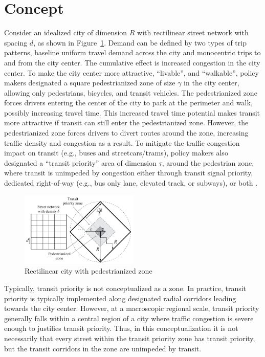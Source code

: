 \documentclass{elsarticle}\usepackage[]{graphicx}\usepackage[]{color}
\begin{document}
\section{Concept}
Consider an idealized city of dimension $R$ with rectilinear street network with spacing $d$, as shown in Figure~\ref{fig:gridcity}. Demand can be defined by two types of trip patterns, baseline uniform travel demand across the city and monocentric trips to and from the city center. The cumulative effect is increased congestion in the city center. To make the city center more attractive, ``livable'', and ``walkable'', policy makers designated a square pedestrianized zone of size $\gamma$ in the city center, allowing only pedestrians, bicycles, and transit vehicles. The pedestrianized zone forces drivers entering the center of the city to park at the perimeter and walk, possibly increasing travel time. This increased travel time potential makes transit more attractive if transit can still enter the pedestrianized zone. However, the pedestrianized zone forces drivers to divert routes around the zone, increasing traffic density and congestion as a result. To mitigate the traffic congestion impact on transit (e.g., buses and streetcars/trams), policy makers also designated a ``transit priority'' area of dimension $\tau$, around the pedestrian zone, where transit is unimpeded by congestion either through transit signal priority, dedicated right-of-way (e.g., bus only lane, elevated track, or subways), or both
. 

\begin{figure}[H]
     \centering
     \includegraphics[width=0.5\textwidth]{diagram_pedtransit_grid_city}
     \caption{Rectilinear city with pedestrianized zone}
     \label{fig:gridcity}
\end{figure}

Typically, transit priority is not conceptualized as a zone. In practice, transit priority is typically implemented along designated radial corridors leading towards the city center. However, at a macroscopic regional scale, transit priority generally falls within a central region of a city where traffic congestion is severe enough to justifies transit priority. Thus, in this conceptualization it is not necessarily that every street within the transit priority zone has transit priority, but the transit corridors in the zone are unimpeded by transit.
\end{document}
